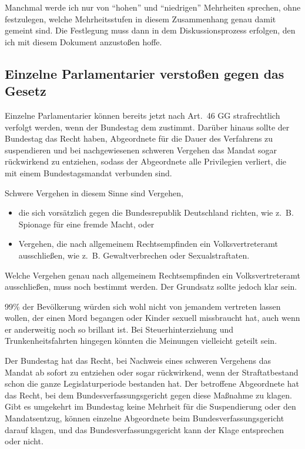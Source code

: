 Manchmal werde ich nur von \enquote{hohen} und \enquote{niedrigen} Mehrheiten sprechen, ohne festzulegen, welche Mehrheitsstufen in diesem Zusammenhang genau damit gemeint sind.
Die Festlegung muss dann in dem Diskussionsprozess erfolgen, den ich mit diesem Dokument anzustoßen hoffe.

\subsection{Einzelne Parlamentarier verstoßen gegen das Gesetz} \label{einzelne_parlamentarier_verstossen_gegen_gesetz}

Einzelne Parlamentarier können bereits jetzt nach Art.~46 GG strafrechtlich verfolgt werden, wenn der Bundestag dem zustimmt.
Darüber hinaus sollte der Bundestag das Recht haben, Abgeordnete für die Dauer des Verfahrens zu suspendieren und bei
nachgewiesenen schweren Vergehen das Mandat sogar rückwirkend zu entziehen, sodass der Abgeordnete alle Privilegien
verliert, die mit einem Bundestagsmandat verbunden sind.

Schwere Vergehen in diesem Sinne sind Vergehen,
\begin{itemize}
  \item die sich vorsätzlich gegen die Bundesrepublik Deutschland richten, wie z.~B. Spionage für eine fremde Macht, oder
  \item Vergehen, die nach allgemeinem Rechtsempfinden ein Volksvertreteramt ausschließen, wie z.~B. Gewaltverbrechen oder Sexualstraftaten.
 \end{itemize}

Welche Vergehen genau nach allgemeinem Rechtsempfinden ein Volksvertreteramt ausschließen, muss noch bestimmt werden.
Der Grundsatz sollte jedoch klar sein.

99\% der Bevölkerung würden sich wohl nicht von jemandem vertreten lassen wollen, der einen Mord begangen oder Kinder sexuell missbraucht hat, auch wenn er anderweitig noch so brillant ist.
Bei Steuerhinterziehung und Trunkenheitsfahrten hingegen könnten die Meinungen vielleicht geteilt sein.

Der Bundestag hat das Recht, bei Nachweis eines schweren Vergehens das Mandat ab sofort zu entziehen oder sogar rückwirkend, wenn der Straftatbestand schon die ganze
Legislaturperiode bestanden hat.
Der betroffene Abgeordnete hat das Recht, bei dem Bundesverfassungsgericht gegen diese Maßnahme zu klagen.
Gibt es umgekehrt im Bundestag keine Mehrheit für die Suspendierung oder den Mandatsentzug, können einzelne Abgeordnete beim Bundesverfassungsgericht darauf klagen, und das
Bundesverfassungsgericht kann der Klage entsprechen oder nicht.

